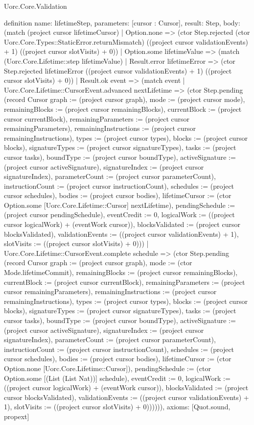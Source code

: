 \begin{lexlean}{Uorc.Core.Validation}
\begin{semanticmodule}
definition{
  name: lifetimeStep,
  parameters: [cursor : Cursor],
  result: Step,
  body: (match (project cursor lifetimeCursor)
    | Option.none => (ctor Step.rejected (ctor Uorc.Core.Types::StaticError.returnMismatch) ((project cursor validationEvents) + 1) ((project cursor slotVisits) + 0))
    | Option.some lifetimeValue => (match (Uorc.Core.Lifetime::step lifetimeValue)
      | Result.error lifetimeError => (ctor Step.rejected lifetimeError ((project cursor validationEvents) + 1) ((project cursor slotVisits) + 0))
      | Result.ok event => (match event
        | Uorc.Core.Lifetime::CursorEvent.advanced nextLifetime => (ctor Step.pending (record Cursor {graph := (project cursor graph), mode := (project cursor mode), remainingBlocks := (project cursor remainingBlocks), currentBlock := (project cursor currentBlock), remainingParameters := (project cursor remainingParameters), remainingInstructions := (project cursor remainingInstructions), types := (project cursor types), blocks := (project cursor blocks), signatureTypes := (project cursor signatureTypes), tasks := (project cursor tasks), boundType := (project cursor boundType), activeSignature := (project cursor activeSignature), signatureIndex := (project cursor signatureIndex), parameterCount := (project cursor parameterCount), instructionCount := (project cursor instructionCount), schedules := (project cursor schedules), bodies := (project cursor bodies), lifetimeCursor := (ctor Option.some [Uorc.Core.Lifetime::Cursor] nextLifetime), pendingSchedule := (project cursor pendingSchedule), eventCredit := 0, logicalWork := ((project cursor logicalWork) + (eventWork cursor)), blocksValidated := (project cursor blocksValidated), validationEvents := ((project cursor validationEvents) + 1), slotVisits := ((project cursor slotVisits) + 0)}))
        | Uorc.Core.Lifetime::CursorEvent.complete schedule => (ctor Step.pending (record Cursor {graph := (project cursor graph), mode := (ctor Mode.lifetimeCommit), remainingBlocks := (project cursor remainingBlocks), currentBlock := (project cursor currentBlock), remainingParameters := (project cursor remainingParameters), remainingInstructions := (project cursor remainingInstructions), types := (project cursor types), blocks := (project cursor blocks), signatureTypes := (project cursor signatureTypes), tasks := (project cursor tasks), boundType := (project cursor boundType), activeSignature := (project cursor activeSignature), signatureIndex := (project cursor signatureIndex), parameterCount := (project cursor parameterCount), instructionCount := (project cursor instructionCount), schedules := (project cursor schedules), bodies := (project cursor bodies), lifetimeCursor := (ctor Option.none [Uorc.Core.Lifetime::Cursor]), pendingSchedule := (ctor Option.some [(List (List Nat))] schedule), eventCredit := 0, logicalWork := ((project cursor logicalWork) + (eventWork cursor)), blocksValidated := (project cursor blocksValidated), validationEvents := ((project cursor validationEvents) + 1), slotVisits := ((project cursor slotVisits) + 0)}))))),
  axioms: [Quot.sound, propext]
}


\end{semanticmodule}
\end{lexlean}
